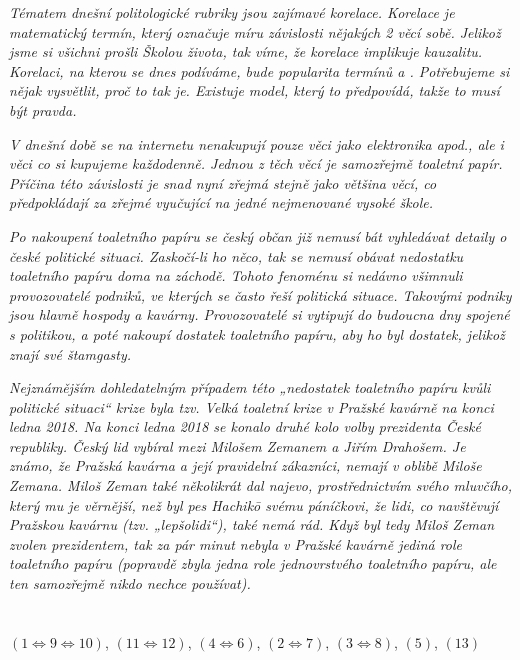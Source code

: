 \documentclass[12pt, a4paper]{article}
\begin{document}
\textit{Tématem dnešní politologické rubriky jsou zajímavé korelace. Korelace je matematický termín, který označuje míru závislosti nějakých 2 věcí sobě. Jelikož jsme si všichni prošli Školou života, tak víme, že korelace implikuje kauzalitu. Korelaci, na kterou se dnes podíváme, bude popularita termínů  a . Potřebujeme si nějak vysvětlit, proč to tak je. Existuje model, který to předpovídá, takže to musí být pravda. }

\textit{V dnešní době se na internetu nenakupují pouze věci jako elektronika apod., ale i věci co si kupujeme každodenně. Jednou z těch věcí je samozřejmě toaletní papír. Příčina této závislosti je snad nyní zřejmá stejně jako většina věcí, co předpokládají za zřejmé vyučující na jedné nejmenované vysoké škole.}

\textit{Po nakoupení toaletního papíru se český občan již nemusí bát vyhledávat detaily o české politické situaci. Zaskočí-li ho něco, tak se nemusí obávat nedostatku toaletního papíru doma na záchodě. Tohoto fenoménu si nedávno všimnuli provozovatelé podniků, ve kterých se často řeší politická situace. Takovými podniky jsou hlavně hospody a kavárny. Provozovatelé si vytipují do budoucna dny spojené s politikou, a poté nakoupí dostatek toaletního papíru, aby ho byl dostatek, jelikož znají své štamgasty.}

\textit{Nejznámějším dohledatelným případem této „nedostatek toaletního papíru kvůli politické situaci“ krize byla tzv. Velká toaletní krize v Pražské kavárně na konci ledna 2018. Na konci ledna 2018 se konalo druhé kolo volby prezidenta České republiky. Český lid vybíral mezi Milošem Zemanem a Jiřím Drahošem. Je známo, že Pražská kavárna a její pravidelní zákazníci, nemají v oblibě Miloše Zemana. Miloš Zeman také několikrát dal najevo, prostřednictvím svého mluvčího, který mu je věrnější, než byl pes Hachikō svému páníčkovi, že lidi, co navštěvují Pražskou kavárnu (tzv. „lepšolidi“), také nemá rád. Když byl tedy Miloš Zeman zvolen prezidentem, tak za pár minut nebyla v Pražské kavárně jediná role toaletního papíru (popravdě zbyla jedna role jednovrstvého toaletního papíru, ale ten samozřejmě nikdo nechce používat).}

\section{}
$(1 \iff 9 \iff 10)$, $(11 \iff 12)$, $(4 \iff 6)$, $(2 \iff 7)$, $(3 \iff 8)$, $(5)$, $(13)$\\
\end{document}
